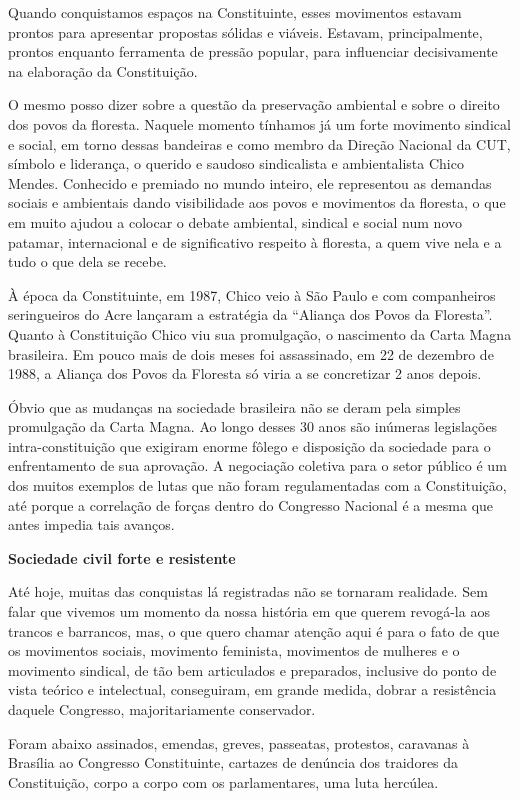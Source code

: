 Quando conquistamos espaços na Constituinte, esses movimentos estavam
prontos para apresentar propostas sólidas e viáveis. Estavam,
principalmente, prontos enquanto ferramenta de pressão popular, para
influenciar decisivamente na elaboração da Constituição.

O mesmo posso dizer sobre a questão da preservação ambiental e sobre o
direito dos povos da floresta. Naquele momento tínhamos já um forte
movimento sindical e social, em torno dessas bandeiras e como membro da
Direção Nacional da CUT, símbolo e liderança, o querido e saudoso
sindicalista e ambientalista Chico Mendes. Conhecido e premiado no mundo
inteiro, ele representou as demandas sociais e ambientais dando
visibilidade aos povos e movimentos da floresta, o que em muito ajudou a
colocar o debate ambiental, sindical e social num novo patamar,
internacional e de significativo respeito à floresta, a quem vive nela e
a tudo o que dela se recebe.

À época da Constituinte, em 1987, Chico veio à São Paulo e com
companheiros seringueiros do Acre lançaram a estratégia da ``Aliança dos
Povos da Floresta''. Quanto à Constituição Chico viu sua promulgação, o
nascimento da Carta Magna brasileira. Em pouco mais de dois meses foi
assassinado, em 22 de dezembro de 1988, a Aliança dos Povos da Floresta
só viria a se concretizar 2 anos depois.

Óbvio que as mudanças na sociedade brasileira não se deram pela simples
promulgação da Carta Magna. Ao longo desses 30 anos são inúmeras
legislações intra-constituição que exigiram enorme fôlego e disposição
da sociedade para o enfrentamento de sua aprovação. A negociação
coletiva para o setor público é um dos muitos exemplos de lutas que não
foram regulamentadas com a Constituição, até porque a correlação de
forças dentro do Congresso Nacional é a mesma que antes impedia tais
avanços.

\textbf{Sociedade civil forte e resistente}

Até hoje, muitas das conquistas lá registradas não se tornaram
realidade. Sem falar que vivemos um momento da nossa história em que
querem revogá-la aos trancos e barrancos, mas, o que quero chamar
atenção aqui é para o fato de que os movimentos sociais, movimento
feminista, movimentos de mulheres e o movimento sindical, de tão bem
articulados e preparados, inclusive do ponto de vista teórico e
intelectual, conseguiram, em grande medida, dobrar a resistência daquele
Congresso, majoritariamente conservador.

Foram abaixo assinados, emendas, greves, passeatas, protestos, caravanas
à Brasília ao Congresso Constituinte, cartazes de denúncia dos traidores
da Constituição, corpo a corpo com os parlamentares, uma luta hercúlea.

